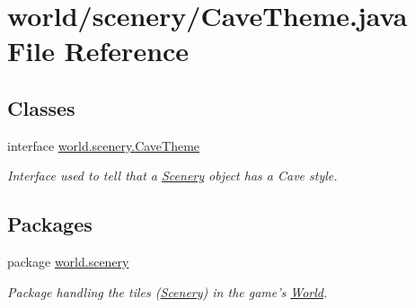 \hypertarget{a00063}{\section{world/scenery/\-Cave\-Theme.java File Reference}
\label{a00063}
}
\subsection*{Classes}
\begin{DoxyCompactItemize}
\item 
interface \hyperlink{a00004}{world.\-scenery.\-Cave\-Theme}
\begin{DoxyCompactList}\small\item\em Interface used to tell that a \hyperlink{a00024}{Scenery} object has a Cave style. \end{DoxyCompactList}\end{DoxyCompactItemize}
\subsection*{Packages}
\begin{DoxyCompactItemize}
\item 
package \hyperlink{a00091}{world.\-scenery}
\begin{DoxyCompactList}\small\item\em Package handling the tiles (\hyperlink{a00024}{Scenery}) in the game's \hyperlink{a00039}{World}. \end{DoxyCompactList}\end{DoxyCompactItemize}
